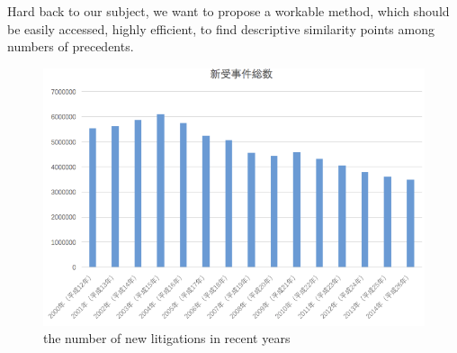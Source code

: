 Hard back to our subject, we want to propose a workable method, which should be easily accessed, highly efficient, to find descriptive similarity points among numbers of precedents.
\begin{figure}[!h]
\centering
\includegraphics[width=400pt]{./pictures/0101-1.png}
\caption{the number of new litigations in recent years}
\end{figure}